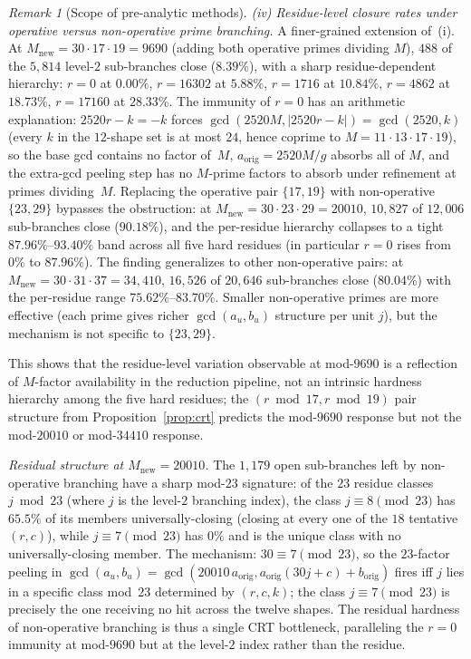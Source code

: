 \documentclass[11pt]{article}
\renewcommand{\_}{\origunderscore\allowbreak}
\theoremstyle{definition}
\theoremstyle{remark}
\newtheorem{remark}[theorem]{Remark}
\begin{document}
\begin{remark}[Scope of pre-analytic methods]
\emph{(iv) Residue-level closure rates under operative versus
non-operative prime branching.} A finer-grained extension of~(i).
At $M_\mathrm{new} = 30 \cdot 17 \cdot 19 = 9690$ (adding both
operative primes dividing $M$), $488$ of the $5{,}814$ level-$2$
sub-branches close ($8.39\%$), with a sharp residue-dependent
hierarchy: $r=0$ at $0.00\%$, $r=16302$ at $5.88\%$, $r=1716$ at
$10.84\%$, $r=4862$ at $18.73\%$, $r=17160$ at $28.33\%$. The
immunity of $r=0$ has an arithmetic explanation: $2520r - k = -k$
forces $\gcd(2520M, |2520r-k|) = \gcd(2520, k)$ (every $k$ in the
$12$-shape set is at most $24$, hence coprime to
$M = 11\cdot 13\cdot 17\cdot 19$), so the base gcd contains no
factor of~$M$, $a_{\mathrm{orig}} = 2520M/g$ absorbs all of $M$, and
the extra-gcd peeling step has no $M$-prime factors to absorb under
refinement at primes dividing~$M$. Replacing the operative pair
$\{17,19\}$ with non-operative $\{23,29\}$ bypasses the obstruction:
at $M_\mathrm{new} = 30\cdot 23\cdot 29 = 20010$, $10{,}827$ of
$12{,}006$ sub-branches close ($90.18\%$), and the per-residue
hierarchy collapses to a tight $87.96\%$–$93.40\%$ band across all
five hard residues (in particular $r=0$ rises from $0\%$ to
$87.96\%$). The finding generalizes to other non-operative pairs: at
$M_\mathrm{new} = 30\cdot 31\cdot 37 = 34{,}410$, $16{,}526$ of
$20{,}646$ sub-branches close ($80.04\%$) with the per-residue range
$75.62\%$–$83.70\%$. Smaller non-operative primes are more effective
(each prime gives richer $\gcd(a_u, b_u)$ structure per unit $j$), but
the mechanism is not specific to $\{23, 29\}$.

This shows that the residue-level variation observable at mod-$9690$
is a reflection of $M$-factor availability in the reduction pipeline,
not an intrinsic hardness hierarchy among the five hard residues; the
$(r \bmod 17, r\bmod 19)$ pair structure from
Proposition~\ref{prop:crt} predicts the mod-$9690$
response but not the mod-$20010$ or mod-$34410$ response.

\emph{Residual structure at $M_\mathrm{new}{=}20010$.} The $1{,}179$
open sub-branches left by non-operative branching have a sharp
mod-$23$ signature: of the $23$ residue classes $j \bmod 23$ (where
$j$ is the level-$2$ branching index), the class $j \equiv 8 \pmod{23}$
has $65.5\%$ of its members universally-closing (closing at every one
of the $18$ tentative $(r,c)$), while $j \equiv 7 \pmod{23}$ has $0\%$
and is the unique class with no universally-closing member. The
mechanism: $30 \equiv 7 \pmod{23}$, so the $23$-factor peeling in
$\gcd(a_u, b_u) = \gcd(20010\,a_{\mathrm{orig}},
a_{\mathrm{orig}}(30 j + c) + b_{\mathrm{orig}})$ fires iff $j$ lies
in a specific class mod~$23$ determined by $(r, c, k)$; the class
$j \equiv 7 \pmod{23}$ is precisely the one receiving no hit across
the twelve shapes. The residual hardness of non-operative branching
is thus a single CRT bottleneck, paralleling the $r=0$ immunity at
mod-$9690$ but at the level-$2$ index rather than the residue.


\end{remark}
\end{document}
